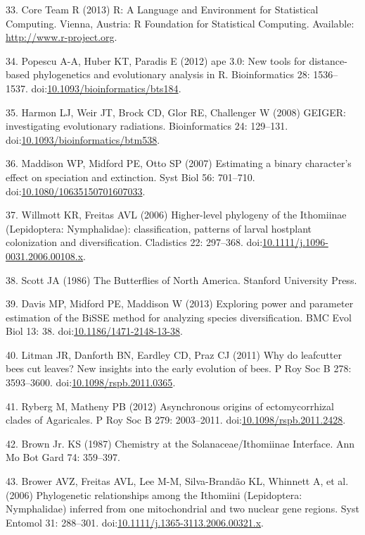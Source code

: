 \documentclass[10pt]{article}
\begin{document}
33. Core Team R (2013) R: A Language and Environment for Statistical
Computing. Vienna, Austria: R Foundation for Statistical Computing.
Available: \url{http://www.r-project.org}.

34. Popescu A-A, Huber KT, Paradis E (2012) ape 3.0: New tools for
distance-based phylogenetics and evolutionary analysis in R.
Bioinformatics 28: 1536--1537.
doi:\href{http://dx.doi.org/10.1093/bioinformatics/bts184}{10.1093/bioinformatics/bts184}.

35. Harmon LJ, Weir JT, Brock CD, Glor RE, Challenger W (2008) GEIGER:
investigating evolutionary radiations. Bioinformatics 24: 129--131.
doi:\href{http://dx.doi.org/10.1093/bioinformatics/btm538}{10.1093/bioinformatics/btm538}.

36. Maddison WP, Midford PE, Otto SP (2007) Estimating a binary
character's effect on speciation and extinction. Syst Biol 56: 701--710.
doi:\href{http://dx.doi.org/10.1080/10635150701607033}{10.1080/10635150701607033}.

37. Willmott KR, Freitas AVL (2006) Higher-level phylogeny of the
Ithomiinae (Lepidoptera: Nymphalidae): classification, patterns of
larval hostplant colonization and diversification. Cladistics 22:
297--368.
doi:\href{http://dx.doi.org/10.1111/j.1096-0031.2006.00108.x}{10.1111/j.1096-0031.2006.00108.x}.

38. Scott JA (1986) The Butterflies of North America. Stanford
University Press.

39. Davis MP, Midford PE, Maddison W (2013) Exploring power and
parameter estimation of the BiSSE method for analyzing species
diversification. BMC Evol Biol 13: 38.
doi:\href{http://dx.doi.org/10.1186/1471-2148-13-38}{10.1186/1471-2148-13-38}.

40. Litman JR, Danforth BN, Eardley CD, Praz CJ (2011) Why do leafcutter
bees cut leaves? New insights into the early evolution of bees. P Roy
Soc B 278: 3593--3600.
doi:\href{http://dx.doi.org/10.1098/rspb.2011.0365}{10.1098/rspb.2011.0365}.

41. Ryberg M, Matheny PB (2012) Asynchronous origins of ectomycorrhizal
clades of Agaricales. P Roy Soc B 279: 2003--2011.
doi:\href{http://dx.doi.org/10.1098/rspb.2011.2428}{10.1098/rspb.2011.2428}.

42. Brown Jr. KS (1987) Chemistry at the Solanaceae/Ithomiinae
Interface. Ann Mo Bot Gard 74: 359--397.

43. Brower AVZ, Freitas AVL, Lee M-M, Silva-Brandão KL, Whinnett A, et
al. (2006) Phylogenetic relationships among the Ithomiini (Lepidoptera:
Nymphalidae) inferred from one mitochondrial and two nuclear gene
regions. Syst Entomol 31: 288--301.
doi:\href{http://dx.doi.org/10.1111/j.1365-3113.2006.00321.x}{10.1111/j.1365-3113.2006.00321.x}.
\end{document}
